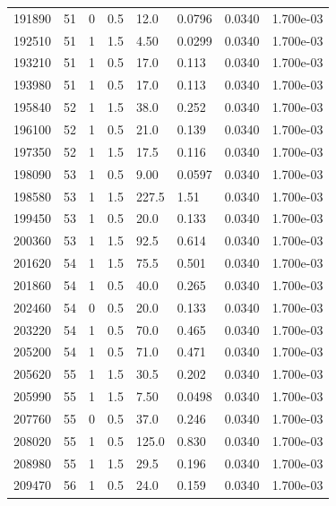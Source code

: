 \documentclass[preview]{standalone}
\begin{document}
{{{{{{{\begin{tabular}{L{1.2cm}C{1.2cm} C{0.3cm}C{0.5cm} C{1.4cm}C{1.4cm} C{1.4cm}C{1.4cm}}
  191890  &    51  & 0     & 0.5 &  12.0  & 0.0796  & 0.0340 &  1.700e-03   \\ 
  192510  &    51  & 1     & 1.5 &  4.50  & 0.0299  & 0.0340 &  1.700e-03   \\ 
  193210  &    51  & 1     & 0.5 &  17.0  & 0.113  & 0.0340 &  1.700e-03   \\ 
  193980  &    51  & 1     & 0.5 &  17.0  & 0.113  & 0.0340 &  1.700e-03   \\ 
  195840  &    52  & 1     & 1.5 &  38.0  & 0.252  & 0.0340 &  1.700e-03   \\ 
  196100  &    52  & 1     & 0.5 &  21.0  & 0.139  & 0.0340 &  1.700e-03   \\ 
  197350  &    52  & 1     & 1.5 &  17.5  & 0.116  & 0.0340 &  1.700e-03   \\ 
  198090  &    53  & 1     & 0.5 &  9.00  & 0.0597  & 0.0340 &  1.700e-03   \\ 
  198580  &    53  & 1     & 1.5 &  227.5  & 1.51  & 0.0340 &  1.700e-03   \\ 
  199450  &    53  & 1     & 0.5 &  20.0  & 0.133  & 0.0340 &  1.700e-03   \\ 
  200360  &    53  & 1     & 1.5 &  92.5  & 0.614  & 0.0340 &  1.700e-03   \\ 
  201620  &    54  & 1     & 1.5 &  75.5  & 0.501  & 0.0340 &  1.700e-03   \\ 
  201860  &    54  & 1     & 0.5 &  40.0  & 0.265  & 0.0340 &  1.700e-03   \\ 
  202460  &    54  & 0     & 0.5 &  20.0  & 0.133  & 0.0340 &  1.700e-03   \\ 
  203220  &    54  & 1     & 0.5 &  70.0  & 0.465  & 0.0340 &  1.700e-03   \\ 
  205200  &    54  & 1     & 0.5 &  71.0  & 0.471  & 0.0340 &  1.700e-03   \\ 
  205620  &    55  & 1     & 1.5 &  30.5  & 0.202  & 0.0340 &  1.700e-03   \\ 
  205990  &    55  & 1     & 1.5 &  7.50  & 0.0498  & 0.0340 &  1.700e-03   \\ 
  207760  &    55  & 0     & 0.5 &  37.0  & 0.246  & 0.0340 &  1.700e-03   \\ 
  208020  &    55  & 1     & 0.5 &  125.0  & 0.830  & 0.0340 &  1.700e-03   \\ 
  208980  &    55  & 1     & 1.5 &  29.5  & 0.196  & 0.0340 &  1.700e-03   \\ 
  209470  &    56  & 1     & 0.5 &  24.0  & 0.159  & 0.0340 &  1.700e-03   \\ 

\end{tabular}}}}}}}}
\end{document}
